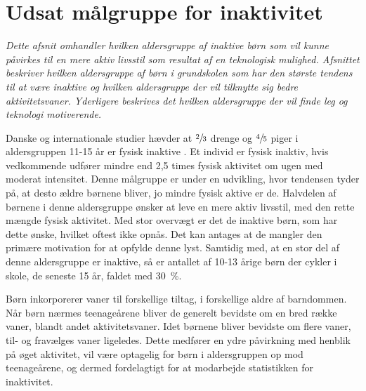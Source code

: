\section {Udsat målgruppe for inaktivitet}
\textit{Dette afsnit omhandler hvilken aldersgruppe af inaktive børn som vil kunne påvirkes til en mere aktiv livsstil som resultat af en teknologisk mulighed. Afsnittet beskriver hvilken aldersgruppe af børn i grundskolen som har den største tendens til at være inaktive og hvilken aldersgruppe der vil tilknytte sig bedre aktivitetsvaner. Yderligere beskrives det hvilken aldersgruppe der vil finde leg og teknologi motiverende.}
				
Danske og internationale studier hævder at $\sfrac{2}{3}$ drenge og $\sfrac{4}{5}$ piger i aldersgruppen 11-15 år er fysisk inaktive \citep{SundhedsstyrrelsenFaktaark}. Et individ er fysisk inaktiv, hvis vedkommende udfører mindre end 2,5 times fysisk aktivitet om ugen med moderat intensitet. \citep{Kiens2007}
Denne målgruppe er under en udvikling, hvor tendensen tyder på, at desto ældre børnene bliver, jo mindre fysisk aktive er de. Halvdelen af børnene i denne aldersgruppe ønsker at leve en mere aktiv livsstil, med den rette mængde fysisk aktivitet. Med stor overvægt er det de inaktive børn, som har dette ønske, hvilket oftest ikke opnås. Det kan antages at de mangler den primære motivation for at opfylde denne lyst. Samtidig med, at en stor del af denne aldersgruppe er inaktive, så er antallet af 10-13 årige børn der cykler i skole, de seneste 15 år, faldet med 30~\%. \citep{Sundhedsstyrelsen2006}

Børn inkorporerer vaner til forskellige tiltag, i forskellige aldre af barndommen. Når børn nærmes teenageårene bliver de generelt bevidste om en bred række vaner, blandt andet aktivitetsvaner. Idet børnene bliver bevidste om flere vaner, til- og fravælges vaner ligeledes. Dette medfører en ydre påvirkning med henblik på øget aktivitet, vil være optagelig for børn i aldersgruppen op mod teenageårene, og dermed fordelagtigt for at modarbejde statistikken for inaktivitet. \citep{Laub2011} 

